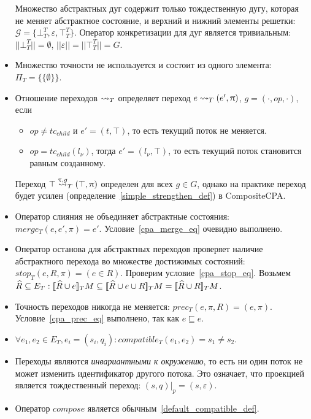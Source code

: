 \begin{itemize}
Множество абстрактных дуг содержит только тождественную дугу, которая не меняет абстрактное состояние, и верхний и нижний элементы решетки: $\mathcal{G} = \{\bot^T_T, \varepsilon, \top^T_T\}$.
Оператор конкретизации для дуг является тривиальным: $||\bot^T_T|| = \emptyset$, $||\varepsilon|| = ||\top^T_T|| = G$.

\item Множество точности не используется и состоит из одного элемента: $\Pi_T = \{\{\emptyset\}\}$.

\item Отношение переходов $\leadsto_T$ определяет переход $e \leadsto_T (e', \uppi)$, $g=(\cdot,op,\cdot)$, если 
\begin{itemize}
\item $op\neq tc_{child}$ и $e' = (t, \top)$, то есть текущий поток не меняется.
\item $op=tc_{child}(l_\nu)$, тогда $e' = (l_\nu, \top)$, то есть текущий поток становится равным созданному.
\end{itemize}

Переход $\top \stackrel{\uptau, g}{\leadsto}_T (\top, \uppi)$ определен для всех $g\in G$, однако на практике переход будет усилен (определение~\ref{simple_strengthen_def}) в CompositeCPA.

\item Оператор слияния не объединяет абстрактные состояния: $merge_T(e, e', \pi) = e'$. Условие~\ref{cpa_merge_eq} очевидно выполнено.

\item Оператор останова для абстрактных переходов проверяет наличие абстрактного перехода во множестве достижимых состояний: $stop_T(e, R, \pi) = (e \in R)$.
Проверим условие~\ref{cpa_stop_eq}.
Возьмем $\widehat{R} \subseteq E_T: [\![ \widehat{R} \cup e ]\!]_TM \subseteq [\![ \widehat{R} \cup e \cup R ]\!]_TM = [\![ \widehat{R} \cup R ]\!]_TM$.

\item Точность переходов никогда не меняется: $prec_T(e, \pi, R) = (e, \pi)$. Условие~\ref{cpa_prec_eq} выполнено, так как $e \sqsubseteq e$.

\item $\forall e_1, e_2 \in E_T, e_i = (s_i, q_i):compatible_T(e_1,e_2) = s_1 \neq s_2$.

\item Переходы являются {\em инвариантными к окружению}, то есть ни один поток не может изменить идентификатор другого потока.
Это означает, что проекцией является тождественный переход:
$(s, q)|_p = (s, \varepsilon)$.

\item Оператор $compose$ является обычным~\ref{default_compatible_def}.
\end{itemize}


